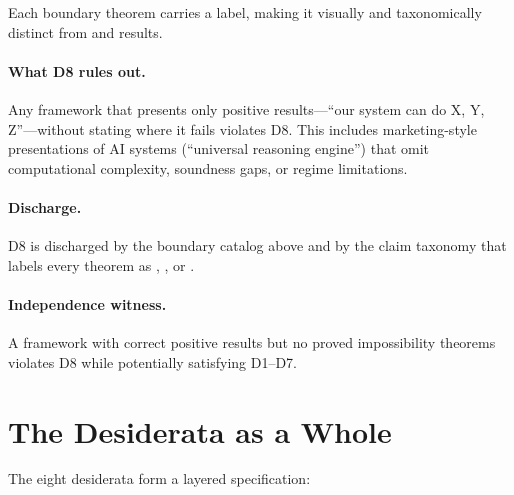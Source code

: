 \documentclass[11pt,openany]{report}
\begin{document}
\noindent
Each boundary theorem carries a \claimBoundary{} label, making it
visually and taxonomically distinct from \claimCore{} and
\claimConditional{} results.

\paragraph{What D8 rules out.}
Any framework that presents only positive results---``our system can
do X, Y, Z''---without stating where it fails violates D8.  This
includes marketing-style presentations of AI systems (``universal
reasoning engine'') that omit computational complexity, soundness
gaps, or regime limitations.

\paragraph{Discharge.}
D8 is discharged by the boundary catalog above and by the claim
taxonomy that labels every theorem as \claimCore{}, \claimConditional{},
or \claimBoundary{}.

\paragraph{Independence witness.}
A framework with correct positive results but no proved impossibility
theorems violates D8 while potentially satisfying D1--D7.


\section{The Desiderata as a Whole}
\label{sec:desiderata-summary}

The eight desiderata form a layered specification:
\end{document}
